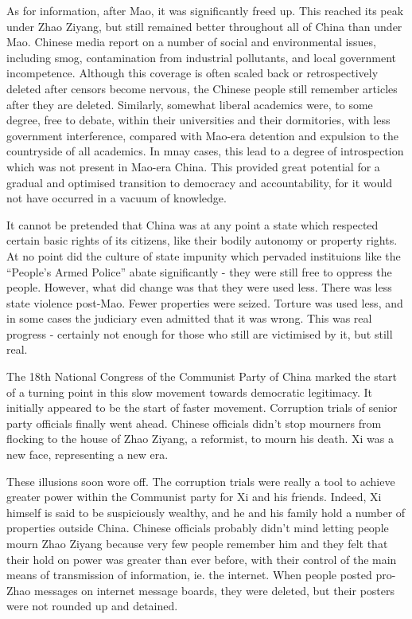 \documentclass[1opt,a4paper]{article}
\newcounter{count}
\begin{document}
\begin{multicols}{2}
As for information, after Mao, it was significantly freed up. This reached its peak under Zhao Ziyang, but still remained better throughout all of China than under Mao. Chinese media report on a number of social and environmental issues, including smog, contamination from industrial pollutants, and local government incompetence. Although this coverage is often scaled back or retrospectively deleted after censors become nervous, the Chinese people still remember articles after they are deleted. Similarly, somewhat liberal academics were, to some degree, free to debate, within their universities and their dormitories, with less government interference, compared with Mao-era detention and expulsion to the countryside of all academics. In mnay cases, this lead to a degree of introspection which was not present in Mao-era China. This provided great potential for a gradual and optimised transition to democracy and accountability, for it would not have occurred in a vacuum of knowledge.

It cannot be pretended that China was at any point a state which respected certain basic rights of its citizens, like their bodily autonomy or property rights. At no point did the culture of state impunity which pervaded instituions like the ``People's Armed Police'' abate significantly - they were still free to oppress the people. However, what did change was that they were used less. There was less state violence post-Mao. Fewer properties were seized. Torture was used less, and in some cases the judiciary even admitted that it was wrong. This was real progress - certainly not enough for those who still are victimised by it, but still real.

The 18th National Congress of the Communist Party of China marked the start of a turning point in this slow movement towards democratic legitimacy. It initially appeared to be the start of faster movement. Corruption trials of senior party officials finally went ahead. Chinese officials didn't stop mourners from flocking to the house of Zhao Ziyang, a reformist, to mourn his death. Xi was a new face, representing a new era.

These illusions soon wore off. The corruption trials were really a tool to achieve greater power within the Communist party for Xi and his friends. Indeed, Xi himself is said to be suspiciously wealthy, and he and his family hold a number of properties outside China. Chinese officials probably didn't mind letting people mourn Zhao Ziyang because very few people remember him and they felt that their hold on power was greater than ever before, with their control of the main means of transmission of information, ie. the internet. When people posted pro-Zhao messages on internet message boards, they were deleted, but their posters were not rounded up and detained.


\end{multicols}
\end{document}
